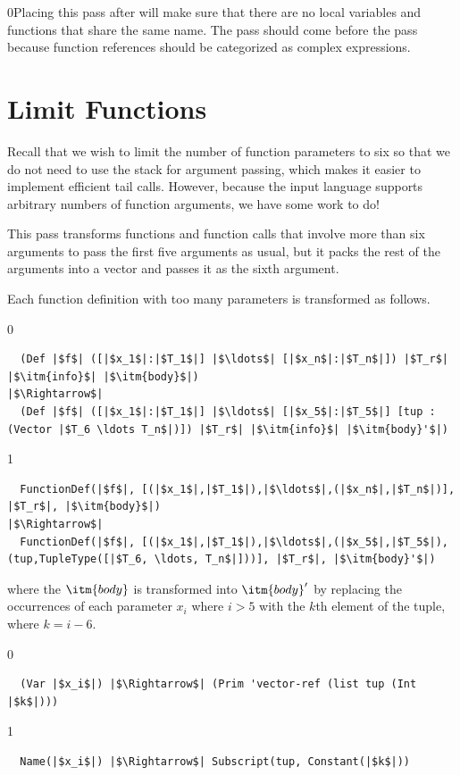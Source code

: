 \documentclass[7x10]{TimesAPriori_MIT}%
\def\racketEd{0}
\def\pythonEd{1}
\def\edition{1}
\newcommand{\racket}[1]{{\if\edition\racketEd{#1}\fi}}
\begin{document}

\racket{Placing this pass after  will make sure that
  there are no local variables and functions that share the same
  name.}
%
The  pass should come before the
 pass because function references
should be categorized as complex expressions.

\section{Limit Functions}
\label{sec:limit-functions-r4}

Recall that we wish to limit the number of function parameters to six
so that we do not need to use the stack for argument passing, which
makes it easier to implement efficient tail calls.  However, because
the input language \LangFun{} supports arbitrary numbers of function
arguments, we have some work to do!

This pass transforms functions and function calls that involve more
than six arguments to pass the first five arguments as usual, but it
packs the rest of the arguments into a vector and passes it as the
sixth argument.

Each function definition with too many parameters is transformed as
follows.
{\if\edition\racketEd   
\begin{lstlisting}
  (Def |$f$| ([|$x_1$|:|$T_1$|] |$\ldots$| [|$x_n$|:|$T_n$|]) |$T_r$| |$\itm{info}$| |$\itm{body}$|) 
|$\Rightarrow$|
  (Def |$f$| ([|$x_1$|:|$T_1$|] |$\ldots$| [|$x_5$|:|$T_5$|] [tup : (Vector |$T_6 \ldots T_n$|)]) |$T_r$| |$\itm{info}$| |$\itm{body}'$|) 
\end{lstlisting}
\fi}
{\if\edition\pythonEd   
\begin{lstlisting}
  FunctionDef(|$f$|, [(|$x_1$|,|$T_1$|),|$\ldots$|,(|$x_n$|,|$T_n$|)], |$T_r$|, |$\itm{body}$|)
|$\Rightarrow$|
  FunctionDef(|$f$|, [(|$x_1$|,|$T_1$|),|$\ldots$|,(|$x_5$|,|$T_5$|),(tup,TupleType([|$T_6, \ldots, T_n$|]))], |$T_r$|, |$\itm{body}'$|) 
\end{lstlisting}
\fi}
%
\noindent where the $\itm{body}$ is transformed into $\itm{body}'$ by
replacing the occurrences of each parameter $x_i$ where $i > 5$ with
the $k$th element of the tuple, where $k = i - 6$.
%
{\if\edition\racketEd
\begin{lstlisting}
  (Var |$x_i$|) |$\Rightarrow$| (Prim 'vector-ref (list tup (Int |$k$|)))
\end{lstlisting}
\fi}
{\if\edition\pythonEd   
\begin{lstlisting}
  Name(|$x_i$|) |$\Rightarrow$| Subscript(tup, Constant(|$k$|))
\end{lstlisting}
\fi}
\end{document}
